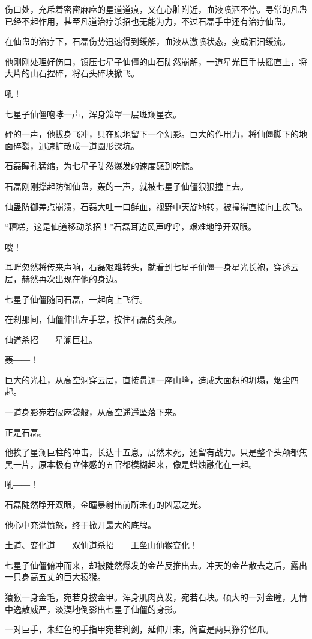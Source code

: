 \begin{this_body}
伤口处，充斥着密密麻麻的星道道痕，又在心脏附近，血液喷洒不停。寻常的凡蛊已经不起作用，甚至凡道治疗杀招也无能为力，不过石磊手中还有治疗仙蛊。

在仙蛊的治疗下，石磊伤势迅速得到缓解，血液从激喷状态，变成汩汩缓流。

他刚刚处理好伤口，镇压七星子仙僵的山石陡然崩解，一道星光巨手扶摇直上，将大片的山石捏碎，将石头碎块掀飞。

吼！

七星子仙僵咆哮一声，浑身笼罩一层斑斓星衣。

砰的一声，他拔身飞冲，只在原地留下一个幻影。巨大的作用力，将仙僵脚下的地面碎裂，迅速扩散成一道圆形深坑。

石磊瞳孔猛缩，为七星子陡然爆发的速度感到吃惊。

石磊刚刚撑起防御仙蛊，轰的一声，就被七星子仙僵狠狠撞上去。

仙蛊防御差点崩溃，石磊大吐一口鲜血，视野中天旋地转，被撞得直接向上疾飞。

“糟糕，这是仙道移动杀招！”石磊耳边风声呼呼，艰难地睁开双眼。

嗖！

耳畔忽然将传来声响，石磊艰难转头，就看到七星子仙僵一身星光长袍，穿透云层，赫然再次出现在他的身边。

七星子仙僵随同石磊，一起向上飞行。

在刹那间，仙僵伸出左手掌，按住石磊的头颅。

仙道杀招――星澜巨柱。

轰――！

巨大的光柱，从高空洞穿云层，直接贯通一座山峰，造成大面积的坍塌，烟尘四起。

一道身影宛若破麻袋般，从高空遥遥坠落下来。

正是石磊。

他挨了星澜巨柱的冲击，长达十五息，居然未死，还留有战力。只是整个头颅都焦黑一片，原本极有立体感的五官都模糊起来，像是蜡烛融化在一起。

吼――！

石磊陡然睁开双眼，金瞳暴射出前所未有的凶恶之光。

他心中充满愤怒，终于掀开最大的底牌。

土道、变化道――双仙道杀招――王垒山仙猴变化！

七星子仙僵俯冲而来，却被陡然爆发的金芒反推出去。冲天的金芒散去之后，露出一只身高五丈的巨大猿猴。

猿猴一身金毛，宛若身披金甲。浑身肌肉贲发，宛若石块。硕大的一对金瞳，无情中逸散威严，淡漠地倒影出七星子仙僵的身影。

一对巨手，朱红色的手指甲宛若利剑，延伸开来，简直是两只狰狞怪爪。


\end{this_body}
